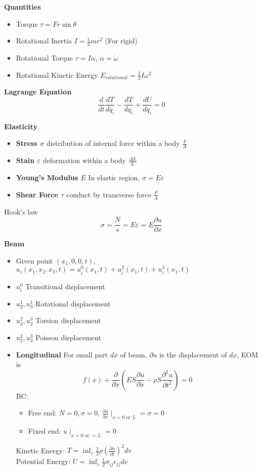 \documentclass{article}
\begin{document}
\begin{multicols*}{2}
  \noindent\textbf{Quantities}
  \begin{itemize}
  \item Torque $\tau = Fr \sin\theta$
  \item Rotational Inertia $I=\frac{1}{2}mr^2$ (For rigid)
  \item Rotational Torque $\tau = I\alpha$, $\alpha = \dot{\omega}$
  \item Rotational Kinetic Energy $E_{rotational}=\frac{1}{2}I\omega^2$
  \end{itemize}

  \noindent\textbf{Lagrange Equation}
  \begin{equation*}
    \frac{d}{dt}\frac{dT}{d\dot{q_i}} - \frac{dT}{dq_i} + \frac{dU}{dq_i} = 0
  \end{equation*}

  \noindent\textbf{Elasticity}
  \begin{itemize}
  \item \textbf{Stress $\sigma$} distribution of internal force within a body $\frac{F}{A}$
  \item \textbf{Stain $\varepsilon$} deformation within a body $\frac{\Delta L}{L}$
  \item \textbf{Young's Modulus $E$} In elastic region, $\sigma = E\varepsilon$
  \item \textbf{Shear Force $\tau$} conduct by transverse force $\frac{F}{A}$
  \end{itemize}
  Hook's law
  \begin{equation*}
    \sigma=\frac{N}{s}=E\varepsilon=E\frac{\partial u}{\partial x}
  \end{equation*}

  \noindent\textbf{Beam}
  \begin{itemize}
  \item Given point $(x_1, 0, 0, t)$, $u_i(x_1, x_2, x_3, t) = u_i^0(x_1,t) + u_i^2(x_1,t) + u_i^3(x_1,t)$
  \item $u_i^0$ Transitional displacement
  \item $u_2^1, u_3^1$ Rotational displacement
  \item $u_3^2, u_2^3$ Torsion displacement
  \item $u_2^2, u_3^3$ Poisson displacement
  \item \textbf{Longitudinal} For small part $dx$ of beam, $\partial u$ is the displacement of $dx$, EOM is
    \begin{equation*}
      f(x) + \frac{\partial}{\partial x}(ES\frac{\partial u}{\partial x} -\rho S\frac{\partial^2 u}{\partial t^2}) = 0
    \end{equation*}
    BC:
    \begin{itemize}
    \item Free end: $N=0, \sigma=0$, $\frac{\partial u}{\partial x}\mid_{x=0 \text{ or } L} = \sigma = 0$
    \item Fixed end: $u\mid_{x=0 \text{ or } = L} = 0$
    \end{itemize}
    Kinetic Energy: $T = \inf_v \frac{1}{2} \rho (\frac{\partial u}{\partial t})^2 dv$\\
    Potential Energy: $U = \inf_v \frac{1}{2}\sigma_{ij} \epsilon_{ij} dv$


\end{itemize}
\end{multicols*}
\end{document}
